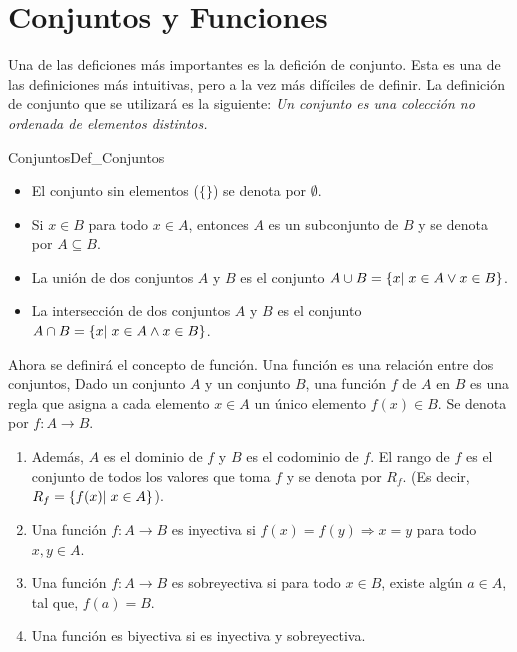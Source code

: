 \section{Conjuntos y Funciones}

Una de las deficiones más importantes es la defición de conjunto. Esta es una de las definiciones más intuitivas, pero a la vez más difíciles de definir.
La definición de conjunto que se utilizará es la siguiente: \textit{Un conjunto es una colección no ordenada de elementos distintos.}\footnotemark[1]


\begin{Def}{Conjuntos}{Def_Conjuntos}
    \begin{itemize}{}
        \item  El conjunto sin elementos ($\{ \}$) se denota por $\emptyset$.
        \item Si $x \in B $ para todo $x \in A $, entonces $A$ es un subconjunto de $B$ y se denota por $A \subseteq B$.
        \item La unión de dos conjuntos $A$ y $B$ es el conjunto $A \cup B = \{ x | \hspace{0.1cm} x \in A \lor x \in B \}$.
        \item La intersección de dos conjuntos $A$ y $B$ es el conjunto $A \cap B = \{ x | \hspace{0.1cm} x \in A \land x \in B \}$.
    \end{itemize}
\end{Def}

\vspace{1cm}

Ahora se definirá el concepto de función. Una función es una relación entre dos conjuntos, Dado un conjunto $A$ y un conjunto $B$, una función $f$ de $A$ en $B$ es
una regla que asigna a cada elemento $x \in A$ un único elemento $f(x) \in B$. Se denota por $f: A \rightarrow B$.
\begin{enumerate}
    \item   Además, $A$ es el dominio de $f$ y $B$ es el codominio de $f$. El rango de $f$ es el conjunto de todos los valores que toma $f$ y se denota por $R_{f}$. (Es decir, $R_{f} = \{ f(x) | \hspace{0.1cm} x \in A \}$).\vspace{0.1cm}
    \item   Una función $f: A \rightarrow B$ es inyectiva si $f(x) = f(y) \Rightarrow x = y$ para todo $x,y \in A$.\footnotemark[2]
    \item   Una función $f: A \rightarrow B$ es sobreyectiva si para todo $x \in B$, existe algún $a \in A$, tal que, $f(a)=B$.\footnotemark[3]
    \item   Una función es biyectiva si es inyectiva y sobreyectiva.
\end{enumerate}

